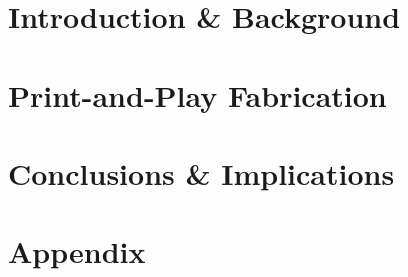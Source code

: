 \documentclass[ oneside,openright,titlepage,numbers=noenddot,%
                headinclude,footinclude,cleardoublepage=empty,abstract=on,
                BCOR=5mm,paper=a4,fontsize=11pt
                ]{scrreprt}
\begin{document}
	\frenchspacing
	\raggedbottom
	\pagestyle{plain}

	
	
	\cleardoublepage
	\cleardoublepage
	\cleardoublepage
	\cleardoublepage
	\cleardoublepage
	\cleardoublepage
	
	\cleardoublepage
	\pagestyle{scrheadings}
	\cleardoublepage
	\part{Introduction \& Background}
		\label{pt:background}
			
		\cleardoublepage
	\part{Print-and-Play Fabrication} 
		\label{pt:print-and-play}
			
	\part{Conclusions \& Implications} 
		\label{pt:implications}

	\cleardoublepage
	\part{Appendix}
	\cleardoublepage
	\cleardoublepage
\end{document}
